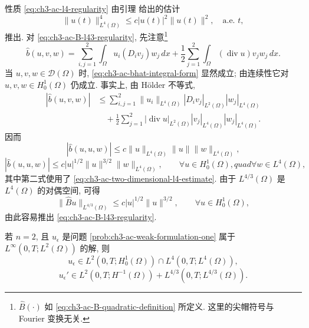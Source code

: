 \begin{Proof}
性质 \eqref{eq:ch3-ac-l4-regularity} 由引理  给出的估计
\begin{equation}
\lVert u(t)\rVert_{L^4(\Omega)}^4
\leq c|u(t)|^2\lVert u(t)\rVert^2,
\quad\text{a.e. }t,
\label{eq:ch3-ac-two-dimensional-l4-estimate}
\end{equation}
推出. 对 \eqref{eq:ch3-ac-B-l43-regularity}, 先注意\footnote{$\widehat B(\cdot)$ 如 \eqref{eq:ch3-ac-B-quadratic-definition} 所定义. 这里的尖帽符号与 Fourier 变换无关.}
\begin{equation}
\widehat b(u,v,w)
=\sum_{i,j=1}^2\int_\Omega u_i(D_i v_j)w_j\,dx
+\frac12\sum_{j=1}^2\int_\Omega(\operatorname{div}u)v_jw_j\,dx.
\label{eq:ch3-ac-bhat-integral-form}
\end{equation}
当 $u,v,w\in\mathcal D(\Omega)$ 时, \eqref{eq:ch3-ac-bhat-integral-form} 显然成立; 由连续性它对 $u,v,w\in H_0^1(\Omega)$ 仍成立. 事实上, 由 H\"older 不等式,
\[
\begin{aligned}
|\widehat b(u,v,w)|
&\leq\sum_{i,j=1}^2
\lVert u_i\rVert_{L^4(\Omega)}|D_i v_j|_{L^2(\Omega)}
|w_j|_{L^4(\Omega)}\\
&\quad+\frac12\sum_{j=1}^2
|\operatorname{div}u|_{L^2(\Omega)}
|v_j|_{L^4(\Omega)}|w_j|_{L^4(\Omega)}.
\end{aligned}
\]
因而
\begin{equation}
|\widehat b(u,u,w)|
\leq c\lVert u\rVert_{L^4(\Omega)}\lVert u\rVert
\lVert w\rVert_{L^4(\Omega)},
\label{eq:ch3-ac-bhat-l4-bound}
\end{equation}
\begin{equation}
|\widehat b(u,u,w)|
\leq c|u|^{1/2}\lVert u\rVert^{3/2}
\lVert w\rVert_{L^4(\Omega)},
\qquad\forall u\in H_0^1(\Omega),quad\forall w\in L^4(\Omega),
\label{eq:ch3-ac-bhat-interpolated-bound}
\end{equation}
其中第二式使用了 \eqref{eq:ch3-ac-two-dimensional-l4-estimate}. 由于 $L^{4/3}(\Omega)$ 是 $L^4(\Omega)$ 的对偶空间, 可得
\begin{equation}
\lVert\widehat B u\rVert_{L^{4/3}(\Omega)}
\leq c|u|^{1/2}\lVert u\rVert^{3/2},
\qquad\forall u\in H_0^1(\Omega),
\label{eq:ch3-ac-B-l43-bound}
\end{equation}
由此容易推出 \eqref{eq:ch3-ac-B-l43-regularity}.
\end{Proof}

\hypertarget{chapter-03-page-311}{}
\begin{Lemma}
\label{lem:ch3-ac-solution-time-regularity}
若 $n=2$, 且 $u_\epsilon$ 是问题 \ref{prob:ch3-ac-weak-formulation-one} 属于 $L^\infty(0,T;L^2(\Omega))$ 的解, 则
\begin{equation}
u_\epsilon\in L^2(0,T;H_0^1(\Omega))
\cap L^4(0,T;L^4(\Omega)),
\label{eq:ch3-ac-solution-l4-space-time}
\end{equation}
\begin{equation}
u_\epsilon'\in L^2(0,T;H^{-1}(\Omega))
+L^{4/3}(0,T;L^{4/3}(\Omega)).
\label{eq:ch3-ac-solution-derivative-sum-space}
\end{equation}
\end{Lemma}

